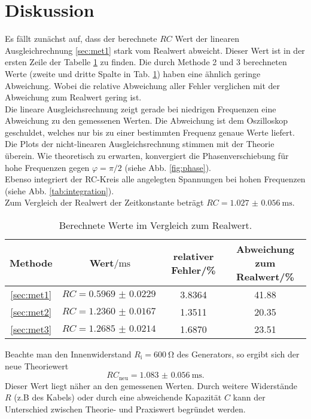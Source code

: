 \section{Diskussion}
\label{sec:Diskussion}

Es fällt zunächst auf, dass der berechnete $RC$ Wert der linearen Ausgleichrechnung \ref{sec:met1} stark vom Realwert abweicht.
Dieser Wert ist in der ersten Zeile der Tabelle \ref{tab:fehler} zu finden.
Die durch Methode 2 und 3 berechneten Werte (zweite und dritte Spalte in Tab. \ref{tab:fehler}) haben eine ähnlich geringe Abweichung.
Wobei die relative Abweichung aller Fehler verglichen mit der Abweichung zum Realwert gering ist.\\
Die lineare Ausgleichsrechnung zeigt gerade bei niedrigen Frequenzen eine Abweichung zu den gemessenen Werten.
Die Abweichung ist dem Oszilloskop geschuldet, welches nur bis zu einer bestimmten Frequenz genaue Werte liefert.\\
Die Plots der nicht-linearen Ausgleichsrechnung stimmen mit der Theorie überein.
Wie theoretisch zu erwarten, konvergiert die Phasenverschiebung für hohe Frequenzen gegen $\varphi = \pi / 2$ (siehe Abb. \ref{fig:phase}).\\
Ebenso integriert der RC-Kreis alle angelegten Spannungen bei hohen Frequenzen (siehe Abb. \ref{tab:integration}).
\\
Zum Vergleich der Realwert der Zeitkonstante beträgt $ RC = \SI{1.027(56)}{\milli \second}$.
\begin{table}
\centering
\caption{Berechnete Werte im Vergleich zum Realwert.}
\begin{tabular}{c|ccc}
    \toprule
    Methode & Wert$/\si{\milli\second} $ & relativer Fehler/\% & Abweichung zum Realwert/\%\\
    \midrule
    \ref{sec:met1} & $RC = \SI{0.5969(229)}{}$ & 3.8364 & 41.88\\
    \ref{sec:met2} & $RC = \SI{1.2360(167)}{}$ & 1.3511 & 20.35\\
    \ref{sec:met3} & $RC = \SI{1.2685(214)}{}$ & 1.6870 & 23.51\\ 
    \bottomrule
\end{tabular}
\label{tab:fehler}
\end{table}
\FloatBarrier
Beachte man den Innenwiderstand $R_\text{i}=\SI{600}{\ohm}$ des Generators, so ergibt sich der neue Theoriewert
\begin{equation*}
    RC_\text{neu} = \SI{1.083(56)}{\milli\second}.
\end{equation*}
Dieser Wert liegt näher an den gemessenen Werten. Durch weitere Widerstände $R$ (z.B des Kabels) oder durch eine abweichende Kapazität $C$
kann der Unterschied zwischen Theorie- und Praxiswert begründet werden.